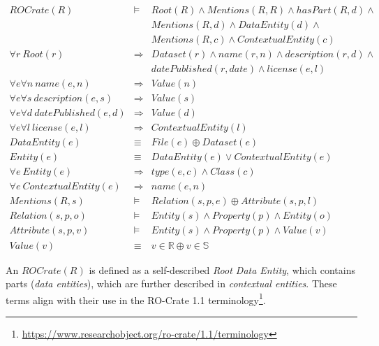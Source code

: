 \small
\begin{eqnarray*}
\label{ch5:minimalcrate}
ROCrate(R)                                  & \models & Root(R) \land Mentions(R, R) \land hasPart(R, d) \land \\
                                            & & Mentions(R, d) \land DataEntity(d) \land \\
                                            & & Mentions(R, c) \land ContextualEntity(c) \\
\forall r \ Root(r)                         & \Rightarrow & Dataset(r) \land name(r, n) \land description(r, d) \land \\
                                            & &             datePublished(r, date) \land license(e, l) \\
\forall e \forall n \ name(e, n)            & \Rightarrow & Value(n) \\
\forall e \forall s \ description(e, s)     & \Rightarrow & Value(s) \\
\forall e \forall d \ datePublished(e, d)   & \Rightarrow & Value(d) \\
\forall e \forall l \ license(e, l)         & \Rightarrow & ContextualEntity(l) \\
DataEntity(e)                               & \equiv &      File(e) \oplus Dataset(e) \\
Entity(e)                                   & \equiv &      DataEntity(e) \lor ContextualEntity(e) \\
\forall e \ Entity(e)                       & \Rightarrow & type(e, c) \land Class(c) \\
\forall e \ ContextualEntity(e)             & \Rightarrow & name(e, n)  \\
Mentions(R, s)                              & \models &     Relation(s, p, e) \oplus Attribute(s,  p, l) \\
Relation(s, p, o)                           & \models &     Entity(s) \land Property(p) \land  Entity(o) \\
Attribute(s, p, v)                          & \models &     Entity(s) \land Property(p) \land Value(v) \\
Value(v)                                    & \equiv &      v \in \mathbb{R} \oplus v \in \mathbb{S}
\end{eqnarray*}
\normalsize

An $ROCrate(R)$ is defined as a self-described \emph{Root Data Entity}, which contains parts (\emph{data entities}), which are further described in \emph{contextual entities}.  These terms align with their use in the RO-Crate 1.1 terminology\footnote{
    \url{https://www.researchobject.org/ro-crate/1.1/terminology}}.

